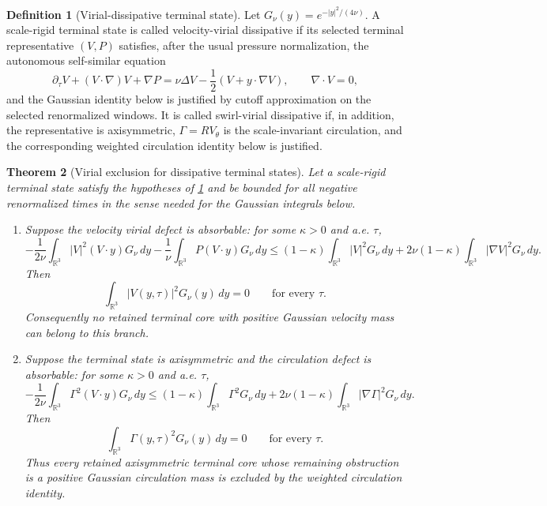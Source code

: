 \documentclass[11pt]{amsart}
\theoremstyle{plain}
\newtheorem{theorem}{Theorem}[section]
\theoremstyle{definition}
\newtheorem{definition}[theorem]{Definition}
\theoremstyle{remark}
\begin{document}
\begin{definition}[Virial-dissipative terminal state]
\label{def:virial-dissipative}
Let \(G_\nu(y)=e^{-|y|^2/(4\nu)}\).  A scale-rigid terminal state is called
velocity-virial dissipative if its selected terminal representative
\((V,P)\) satisfies, after the usual pressure normalization, the autonomous
self-similar equation
\[
  \partial_\tau V+(V\cdot\nabla)V+\nabla P
  =
  \nu\Delta V-\frac12(V+y\cdot\nabla V),
  \qquad \nabla\cdot V=0,
\]
and the Gaussian identity below is justified by cutoff approximation on the
selected renormalized windows.  It is called swirl-virial dissipative if, in
addition, the representative is axisymmetric, \(\Gamma=R V_\theta\) is the
scale-invariant circulation, and the corresponding weighted circulation
identity below is justified.
\end{definition}

\begin{theorem}[Virial exclusion for dissipative terminal states]
\label{thm:virial-exclusion}
Let a scale-rigid terminal state satisfy the hypotheses of
\cref{def:virial-dissipative} and be bounded for all negative renormalized
times in the sense needed for the Gaussian integrals below.

\begin{enumerate}[label=\textup{(\alph*)}]
\item Suppose the velocity virial defect is absorbable: for some
\(\kappa>0\) and a.e. \(\tau\),
\[
  -\frac{1}{2\nu}\int_{\mathbb R^3}|V|^2(V\cdot y)G_\nu\,dy
  -\frac1\nu\int_{\mathbb R^3}P(V\cdot y)G_\nu\,dy
  \le
  (1-\kappa)\int_{\mathbb R^3}|V|^2G_\nu\,dy
  +2\nu(1-\kappa)\int_{\mathbb R^3}|\nabla V|^2G_\nu\,dy .
\]
Then
\[
  \int_{\mathbb R^3}|V(y,\tau)|^2G_\nu(y)\,dy=0
  \qquad\text{for every }\tau.
\]
Consequently no retained terminal core with positive Gaussian velocity mass can
belong to this branch.

\item Suppose the terminal state is axisymmetric and the circulation defect is
absorbable: for some \(\kappa>0\) and a.e. \(\tau\),
\[
  -\frac{1}{2\nu}\int_{\mathbb R^3}\Gamma^2(V\cdot y)G_\nu\,dy
  \le
  (1-\kappa)\int_{\mathbb R^3}\Gamma^2G_\nu\,dy
  +2\nu(1-\kappa)\int_{\mathbb R^3}|\nabla \Gamma|^2G_\nu\,dy .
\]
Then
\[
  \int_{\mathbb R^3}\Gamma(y,\tau)^2G_\nu(y)\,dy=0
  \qquad\text{for every }\tau.
\]
Thus every retained axisymmetric terminal core whose remaining obstruction is a
positive Gaussian circulation mass is excluded by the weighted circulation
identity.
\end{enumerate}
\end{theorem}
\end{document}
